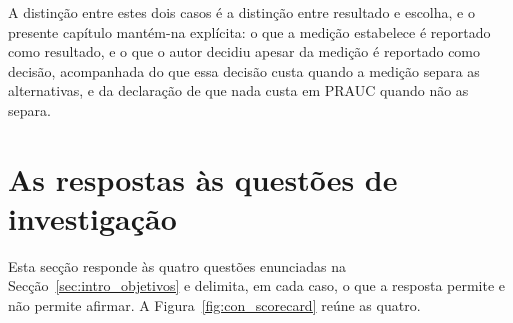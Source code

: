 A distinção entre estes dois casos é a distinção entre resultado e escolha, e o
presente capítulo mantém-na explícita: o que a medição estabelece é reportado como resultado, e o
que o autor decidiu apesar da medição é reportado como decisão, acompanhada do que essa decisão
custa quando a medição separa as alternativas, e da declaração de que nada custa em \gls{PRAUC}
quando não as separa.

\section{As respostas às questões de investigação}
\label{sec:con_respostas}

Esta secção responde às quatro questões enunciadas na Secção~\ref{sec:intro_objetivos} e delimita, em
cada caso, o que a resposta permite e não permite afirmar. A Figura~\ref{fig:con_scorecard} reúne as
quatro.

